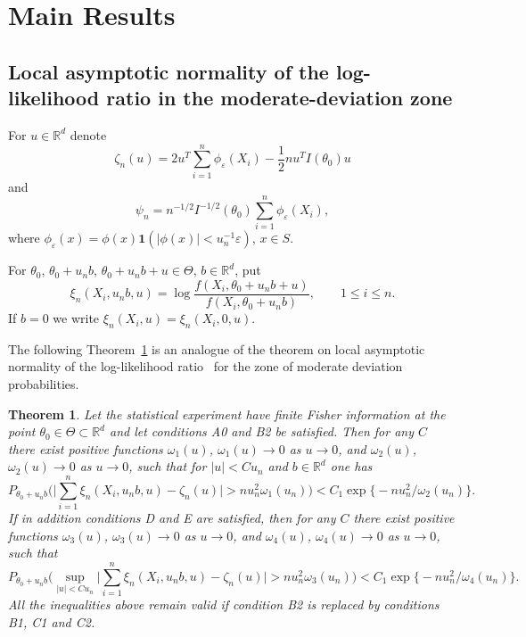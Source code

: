 \documentclass[11pt,a4paper]{article}
\newtheorem{theorem}{Theorem}[section]
\begin{document}
\section{Main Results}
\label{sec:results}

\subsection{Local asymptotic normality of the log-likelihood ratio in the moderate-deviation zone}

For $u\in\mathbb{R}^d$ denote
\begin{equation}
\zeta_n(u)=2u^T\sum_{i=1}^n\phi_\varepsilon(X_i)-\frac12 nu^T I(\theta_0)u
\end{equation}
and
\begin{equation}
\psi_n=n^{-1/2}I^{-1/2}(\theta_0)\sum_{i=1}^n\phi_\varepsilon(X_i),
\end{equation}
where $\phi_\varepsilon(x)=\phi(x)\mathbf{1}(|\phi(x)|<u_n^{-1}\varepsilon)$, $x\in S$.

For $\theta_0$, $\theta_0+u_nb$, $\theta_0+u_nb+u\in\Theta$, $b\in\mathbb{R}^d$, put
\begin{equation}
\xi_n(X_i,u_nb,u)=\log\frac{f(X_i,\theta_0+u_nb+u)}{f(X_i,\theta_0+u_nb)},\qquad 1\le i\le n.
\end{equation}
If $b=0$ we write $\xi_n(X_i,u)=\xi_n(X_i,0,u)$.

The following Theorem~\ref{th:LAN} is an analogue of the theorem on local asymptotic normality of the log-likelihood ratio~\cite{9,10,13,18} for the zone of moderate deviation probabilities.

\begin{theorem}\label{th:LAN}
Let the statistical experiment have finite Fisher information at the point $\theta_0\in\Theta\subset\mathbb{R}^d$ and let conditions A0 and B2 be satisfied. Then for any $C$ there exist positive functions $\omega_1(u)$, $\omega_1(u)\to 0$ as $u\to 0$, and $\omega_2(u)$, $\omega_2(u)\to 0$ as $u\to 0$, such that for $|u|<C u_n$ and $b\in\mathbb{R}^d$ one has
\begin{equation}
P_{\theta_0+u_nb}\Biggl(\Biggl|\sum_{i=1}^n\xi_n(X_i,u_nb,u)-\zeta_n(u)\Biggr|>nu_n^2\omega_1(u_n)\Biggr)<C_1\exp\bigl\{-nu_n^2/\omega_2(u_n)\bigr\}.
\label{eq:13}
\end{equation}
If in addition conditions D and E are satisfied, then for any $C$ there exist positive functions $\omega_3(u)$, $\omega_3(u)\to 0$ as $u\to 0$, and $\omega_4(u)$, $\omega_4(u)\to 0$ as $u\to 0$, such that
\begin{equation}
P_{\theta_0+u_nb}\Biggl(\sup_{|u|<C u_n}\Biggl|\sum_{i=1}^n\xi_n(X_i,u_nb,u)-\zeta_n(u)\Biggr|>nu_n^2\omega_3(u_n)\Biggr)<C_1\exp\bigl\{-nu_n^2/\omega_4(u_n)\bigr\}.
\label{eq:14}
\end{equation}
All the inequalities above remain valid if condition B2 is replaced by conditions B1, C1 and C2.
\end{theorem}
\end{document}
